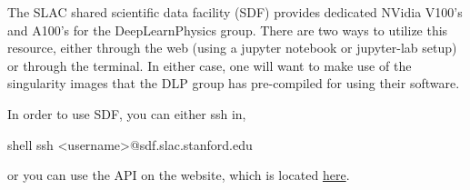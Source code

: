 \documentclass[8pt]{refart}
\begin{document}
  The SLAC shared scientific data facility (SDF) \cite{SDF} provides dedicated NVidia V100's and A100's for the DeepLearnPhysics group.  There are two ways to utilize this resource, either through the web (using a jupyter notebook or jupyter-lab setup) or through the terminal.  In either case, one will want to make use of the singularity images that the DLP group has pre-compiled for using their software.

In order to use SDF, you can either ssh in,
\begin{code}{shell}
ssh <username>@sdf.slac.stanford.edu
\end{code}
or you can use the API on the website, which is located \href{https://sdf.slac.stanford.edu/pun/sys/dashboard}{here}.
\end{document}
